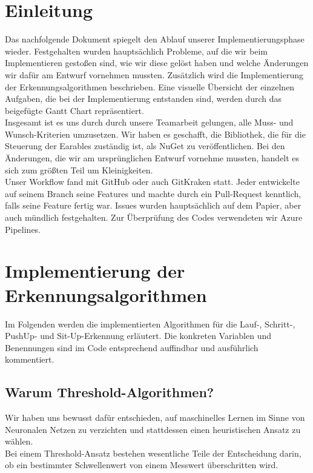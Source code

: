 \documentclass[a4paper,12pt]{article}
\title{\projektName}
\date{\today}
\author{Tec O'Brain}
\begin{document}
\setcounter{page}{2}
\tableofcontents          %
\clearpage
{}

\section{Einleitung}
Das nachfolgende Dokument spiegelt den Ablauf unserer Implementierungsphase wieder. Festgehalten wurden hauptsächlich Probleme, auf die wir beim Implementieren gestoßen sind, wie wir diese gelöst haben und welche Änderungen wir dafür am Entwurf vornehmen mussten. Zusätzlich wird die Implementierung der Erkennungsalgorithmen beschrieben. Eine visuelle Übersicht der einzelnen Aufgaben, die bei der Implementierung entstanden sind, werden durch das beigefügte Gantt Chart repräsentiert.\\
Insgesamt ist es uns durch durch unsere Teamarbeit gelungen, alle Muss- und Wunsch-Kriterien umzusetzen. Wir haben es geschafft, die Bibliothek, die für die Steuerung der Earables zuständig ist, als NuGet zu veröffentlichen. Bei den Änderungen, die wir am ursprünglichen Entwurf vornehme mussten, handelt es sich zum größten Teil um Kleinigkeiten.\\
Unser Workflow fand mit GitHub oder auch GitKraken statt. Jeder entwickelte auf seinem Branch seine Features und machte durch ein Pull-Request kenntlich, falls seine Feature fertig war. Issues wurden hauptsächlich auf dem Papier, aber auch mündlich festgehalten. Zur Überprüfung des Codes verwendeten wir Azure Pipelines.

\section{Implementierung der Erkennungsalgorithmen}
\label{algorithmen}
Im Folgenden werden die implementierten Algorithmen für die Lauf-, Schritt-, PushUp- und  Sit-Up-Erkennung erläutert. Die konkreten Variablen und Benennungen sind im Code entsprechend auffindbar und ausführlich kommentiert.
\subsection{Warum Threshold-Algorithmen?}
Wir haben uns bewusst dafür entschieden, auf maschinelles Lernen im Sinne von Neuronalen Netzen zu verzichten und stattdessen einen heuristischen Ansatz zu wählen.\\
 Bei einem Threshold-Ansatz bestehen wesentliche Teile der Entscheidung darin, ob ein bestimmter Schwellenwert von einem Messwert überschritten wird.
\end{document}
